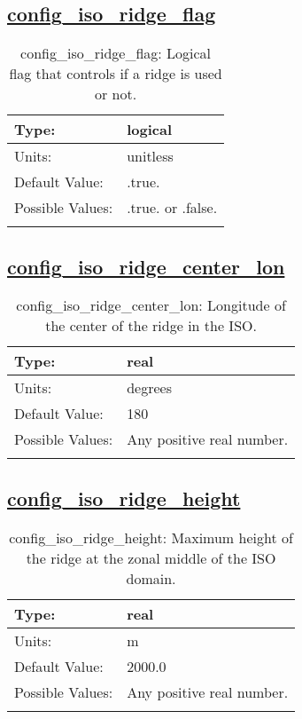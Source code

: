 \subsection[config\_iso\_ridge\_flag]{\hyperref[sec:nm_tab_iso]{config\_iso\_ridge\_flag}}
\label{subsec:nm_sec_config_iso_ridge_flag}
\begin{center}
\begin{longtable}{| p{2.0in} || p{4.0in} |}
    \hline
    Type: & logical \\
    \hline
    Units: & \si{unitless} \\
    \hline
    Default Value: & .true. \\
    \hline
    Possible Values: & .true. or .false. \\
    \hline
    \caption{config\_iso\_ridge\_flag: Logical flag that controls if a ridge is used or not.}
\end{longtable}
\end{center}
\subsection[config\_iso\_ridge\_center\_lon]{\hyperref[sec:nm_tab_iso]{config\_iso\_ridge\_center\_lon}}
\label{subsec:nm_sec_config_iso_ridge_center_lon}
\begin{center}
\begin{longtable}{| p{2.0in} || p{4.0in} |}
    \hline
    Type: & real \\
    \hline
    Units: & \si{degrees} \\
    \hline
    Default Value: & 180 \\
    \hline
    Possible Values: & Any positive real number. \\
    \hline
    \caption{config\_iso\_ridge\_center\_lon: Longitude of the center of the ridge in the ISO.}
\end{longtable}
\end{center}
\subsection[config\_iso\_ridge\_height]{\hyperref[sec:nm_tab_iso]{config\_iso\_ridge\_height}}
\label{subsec:nm_sec_config_iso_ridge_height}
\begin{center}
\begin{longtable}{| p{2.0in} || p{4.0in} |}
    \hline
    Type: & real \\
    \hline
    Units: & \si{m} \\
    \hline
    Default Value: & 2000.0 \\
    \hline
    Possible Values: & Any positive real number. \\
    \hline
    \caption{config\_iso\_ridge\_height: Maximum height of the ridge at the zonal middle of the ISO domain.}
\end{longtable}
\end{center}
